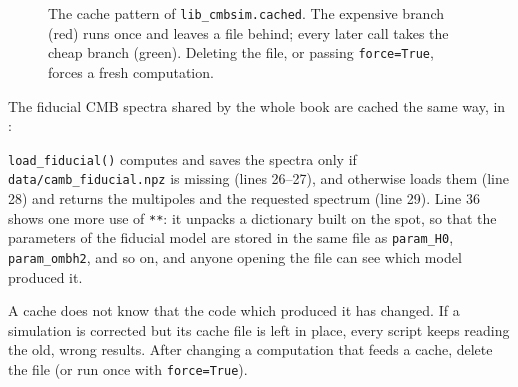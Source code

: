 \begin{figure}[htbp]
\centering
{}
\caption{The cache pattern of \texttt{lib\_cmbsim.cached}. The expensive branch (red) runs once and leaves a file behind; every later call takes the cheap branch (green). Deleting the file, or passing \texttt{force=True}, forces a fresh computation.}
\label{T0a:fig:cache}
\end{figure}

The fiducial CMB spectra shared by the whole book are cached the same way, in :


\texttt{load\_fiducial()} computes and saves the spectra only if \texttt{data/camb\_fiducial.npz} is missing (lines 26--27), and otherwise loads them (line 28) and returns the multipoles and the requested spectrum (line 29). Line 36 shows one more use of \texttt{**}: it unpacks a dictionary built on the spot, so that the parameters of the fiducial model are stored in the same file as \texttt{param\_H0}, \texttt{param\_ombh2}, and so on, and anyone opening the file can see which model produced it.

\begin{pitfall}
A cache does not know that the code which produced it has changed. If a simulation is corrected but its cache file is left in place, every script keeps reading the old, wrong results. After changing a computation that feeds a cache, delete the file (or run once with \texttt{force=True}).
\end{pitfall}
